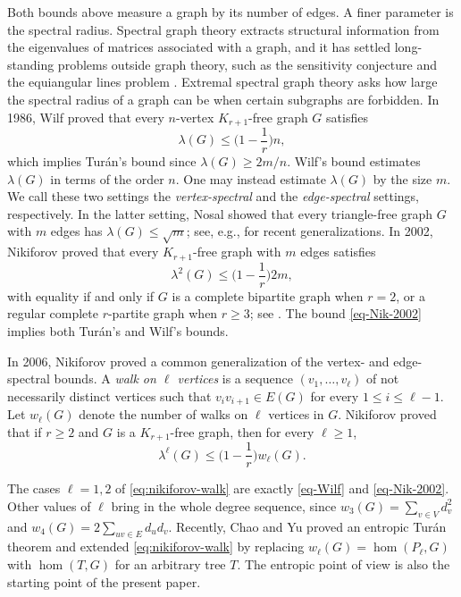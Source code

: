 \documentclass[11pt, a4paper]{article}
\theoremstyle{definition}
\theoremstyle{plain}
\renewcommand{\leq}{\leqslant}
\renewcommand{\le}{\leqslant}
\renewcommand{\ge}{\geqslant}
\begin{document}
Both bounds above measure a graph by its number of edges. A finer parameter is the spectral radius.  
Spectral graph theory extracts structural information from the eigenvalues of matrices associated with a graph, and it has settled long-standing problems outside graph theory, such as the sensitivity conjecture \cite{Huang2019} and 
the equiangular lines problem \cite{JTYZZ2021}. 
Extremal spectral graph theory asks how large the spectral radius of a graph can be when certain subgraphs are forbidden. 
In 1986, Wilf \cite{Wilf1986} proved that every $n$-vertex  $K_{r+1}$-free graph $G$ satisfies  
\begin{equation}  \label{eq-Wilf}
\lambda (G) \le \Big( 1- \frac{1}{r}\Big) n,
\end{equation} 
which implies Tur\'{a}n's bound 
since $\lambda (G)\ge 2m/n$. 
Wilf's bound estimates $\lambda(G)$ in terms of the order $n$. One may instead estimate $\lambda (G)$ by the size $m$. We call these two settings 
 the \emph{vertex-spectral} and the 
\emph{edge-spectral} settings, respectively.  
In the latter setting, Nosal \cite{Nosal1970} showed that every triangle-free graph $G$ with $m$ edges has $\lambda (G)\le \sqrt{m}$; see, e.g., \cite{LNW2021,ZLS2021,NingZhai2023,LLZ2026,CLT2026} for recent generalizations. 
 In 2002, Nikiforov \cite{Nik2002} proved that every $K_{r+1}$-free graph with $m$ edges satisfies 
\begin{equation} \label{eq-Nik-2002}
\lambda^2(G)\le \Big( 1- \frac{1}{r}\Big)2m,
\end{equation}  
with equality if and only if $G$ is a complete bipartite graph when $r=2$, or a regular complete $r$-partite graph when $r\ge 3$;  see \cite{Nik2006, Nik2009}.  
The bound \eqref{eq-Nik-2002} implies both
Tur\'{a}n's and Wilf's bounds. 


\smallskip 
In 2006, Nikiforov \cite{Nik2006} proved a common generalization of the vertex- and edge-spectral bounds. 
A {\it walk on $\ell$ vertices} is a sequence $(v_1,\ldots,v_\ell)$ of not necessarily distinct vertices such that $v_iv_{i+1}\in E(G)$ for every $1\le i\le \ell-1$. Let $w_{\ell}(G)$ denote the number of walks on $\ell$ vertices in $G$. 
Nikiforov \cite[Theorem 14]{Nik2006} proved that  if $r\ge 2$ and $G$ is a $K_{r+1}$-free graph, then for every $\ell \ge 1$, 
\begin{equation} \label{eq:nikiforov-walk}
\lambda^\ell (G) \leq \Big( 1- \frac{1}{r}\Big) w_\ell(G). 
\end{equation}


The cases $\ell =1, 2$ of \eqref{eq:nikiforov-walk} are exactly
\eqref{eq-Wilf} and \eqref{eq-Nik-2002}. Other values of $\ell$ bring in the whole degree sequence, 
since $w_3(G)=\sum_{v\in V}d_v^{2}$ and
$w_4(G)=2\sum_{uv\in E}d_ud_v$.  
Recently, Chao and Yu \cite{CY2026} proved an  entropic Tur\'{a}n theorem and extended \eqref{eq:nikiforov-walk} by replacing
$w_{\ell}(G)=\hom (P_{\ell},G)$ with $\hom (T,G)$ for an arbitrary tree $T$. The entropic point of view is also the starting point of the present paper.      
 
\end{document}
